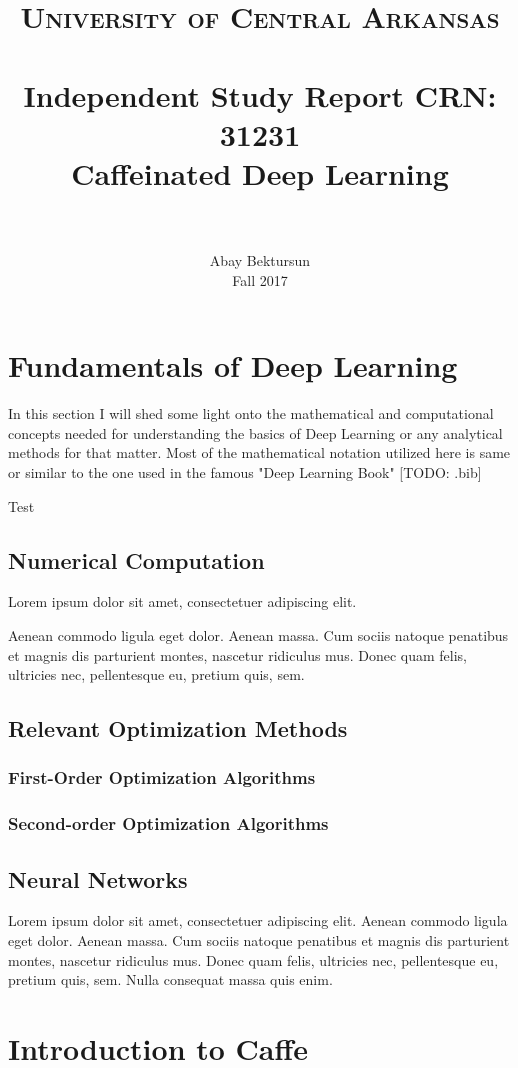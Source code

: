 \documentclass[paper=a4, fontsize=11pt]{scrartcl}
\title{
	\usefont{OT1}{bch}{b}{n}
	\normalfont \normalsize \textsc{University of Central Arkansas} \\ [25pt]
	\horrule{0.5pt} \\[0.4cm]
	\large Independent Study Report CRN: 31231 \\
	\huge Caffeinated Deep Learning \\
	\horrule{2pt} \\[0.5cm]
}
\author{
	\normalfont 			\normalsize
	Abay Bektursun\\[-3pt]	\normalsize
	Fall 2017\\[-3pt]	\normalsize
}
\date{}
\numberwithin{equation}{section}		%
\numberwithin{figure}{section}			%
\numberwithin{table}{section}			%
\begin{document}
	
	\maketitle
	\section{Fundamentals of Deep Learning}
		In this section I will shed some light onto the mathematical and computational concepts needed for understanding the basics of Deep Learning or any analytical methods for that matter. Most of the mathematical notation utilized here is same or similar to the one used in the famous "Deep Learning Book" [TODO: .bib]\par
	Test 
	
	
	\subsection{Numerical Computation}
	Lorem ipsum dolor sit amet, consectetuer adipiscing elit. 
	
	Aenean commodo ligula eget dolor. Aenean massa. Cum sociis natoque penatibus et magnis dis parturient montes, nascetur ridiculus mus. Donec quam felis, ultricies nec, pellentesque eu, pretium quis, sem.
	
	\subsection{Relevant Optimization Methods}
	\subsubsection{First-Order Optimization Algorithms}
	\subsubsection{Second-order Optimization Algorithms}
	
	\subsection{Neural Networks}
	Lorem ipsum dolor sit amet, consectetuer adipiscing elit. Aenean commodo ligula eget dolor. Aenean massa. Cum sociis natoque penatibus et magnis dis parturient montes, nascetur ridiculus mus. Donec quam felis, ultricies nec, pellentesque eu, pretium quis, sem. Nulla consequat massa quis enim. 
	
	\section{Introduction to Caffe}
\end{document}
